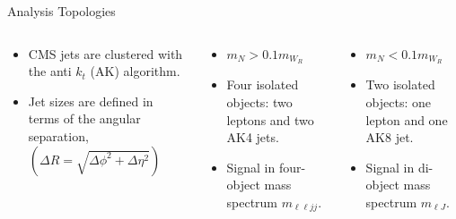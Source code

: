 \documentclass[aspectratio=169]{beamer}
\begin{document}
\begin{frame}[t]{Analysis Topologies}
  \begin{columns}[t]
    \begin{column}{0.32\textwidth}
      \centering
      \resizebox{0.99\linewidth}{!}{%
      }
      {
        \footnotesize
        \begin{itemize}
          \item CMS jets are clustered with the anti $k_t$ (AK) algorithm.
          \item Jet sizes are defined in terms of the angular separation, $\left(\Delta R = \sqrt{\Delta \phi^{2} + \Delta \eta^{2}}\right)$
        \end{itemize}
      }
    \end{column}
    \begin{column}{0.32\textwidth}
      \centering
      \resizebox{0.99\linewidth}{!}{%
      }
      {
        \footnotesize
        \begin{itemize}
          \item $m_{N} > 0.1 m_{W_{R}}$
          \item Four isolated objects: two leptons and two AK4 jets.
          \item Signal in four-object mass spectrum $m_{\ell \ell j j}$.
        \end{itemize}
      }
    \end{column}
    \begin{column}{0.32\textwidth}
      \centering
      \resizebox{0.99\linewidth}{!}{%
      }
      {
        \footnotesize
        \begin{itemize}
          \item $m_{N} < 0.1 m_{W_{R}}$
          \item Two isolated objects: one lepton and one AK8 jet.
          \item Signal in di-object mass spectrum $m_{\ell J}$.
        \end{itemize}
      }
    \end{column}
  \end{columns}
\end{frame}
\end{document}
